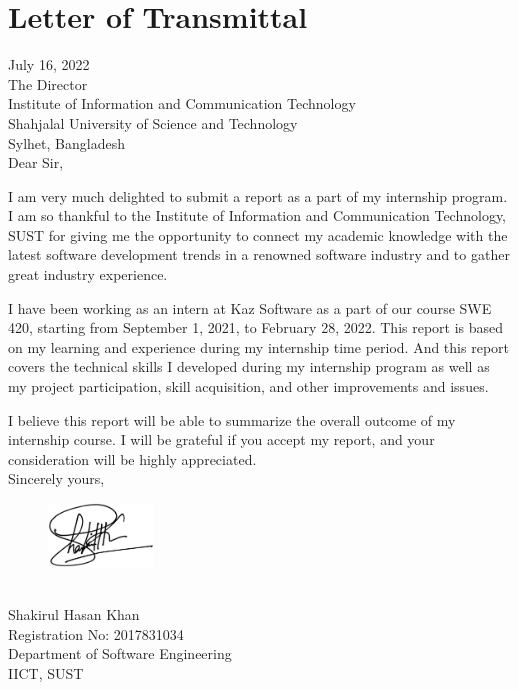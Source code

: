 \chapter*{Letter of Transmittal}

July 16, 2022\\
The Director\\
Institute of Information and Communication Technology\\
Shahjalal University of Science and Technology\\
Sylhet, Bangladesh\\

Dear Sir,

I am very much delighted to submit a report as a part of my internship program.
I am so thankful to the Institute of Information and Communication Technology, SUST for giving me the opportunity to connect my academic knowledge with the latest software development trends in a renowned software industry and to gather great industry experience.

I have been working as an intern at Kaz Software as a part of our course SWE 420, starting from September 1, 2021, to February 28, 2022.
This report is based on my learning and experience during my internship time period. And this report covers the technical skills I developed during my internship program as well as my project participation, skill acquisition, and other improvements and issues.

I believe this report will be able to summarize the overall outcome of my internship course.
I will be grateful if you accept my report, and your consideration will be highly appreciated.\\

Sincerely yours,
\begin{figure}[h]
    \includegraphics[width= 0.25\textwidth]{images/LetterOfTransmittal/mySignCropped.jpg}  
    \label{fig:mySign}
\end{figure}\\
Shakirul Hasan Khan\\
Registration No: 2017831034\\
Department of Software Engineering\\
IICT, SUST